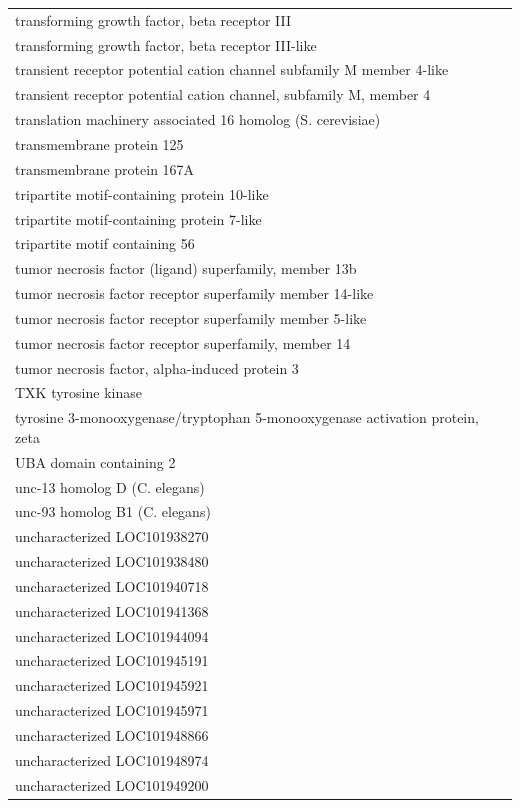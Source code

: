 \documentclass[english]{article}\usepackage[]{graphicx}\usepackage[]{color}
\begin{document}
\begin{longtable}{l}
transforming growth factor, beta receptor III \\ 
transforming growth factor, beta receptor III-like \\ 
transient receptor potential cation channel subfamily M member 4-like \\ 
transient receptor potential cation channel, subfamily M, member 4 \\ 
translation machinery associated 16 homolog (S. cerevisiae) \\ 
transmembrane protein 125 \\ 
transmembrane protein 167A \\ 
tripartite motif-containing protein 10-like \\ 
tripartite motif-containing protein 7-like \\ 
tripartite motif containing 56 \\ 
tumor necrosis factor (ligand) superfamily, member 13b \\ 
tumor necrosis factor receptor superfamily member 14-like \\ 
tumor necrosis factor receptor superfamily member 5-like \\ 
tumor necrosis factor receptor superfamily, member 14 \\ 
tumor necrosis factor, alpha-induced protein 3 \\ 
TXK tyrosine kinase \\ 
tyrosine 3-monooxygenase/tryptophan 5-monooxygenase activation protein, zeta \\ 
UBA domain containing 2 \\ 
unc-13 homolog D (C. elegans) \\ 
unc-93 homolog B1 (C. elegans) \\ 
uncharacterized LOC101938270 \\ 
uncharacterized LOC101938480 \\ 
uncharacterized LOC101940718 \\ 
uncharacterized LOC101941368 \\ 
uncharacterized LOC101944094 \\ 
uncharacterized LOC101945191 \\ 
uncharacterized LOC101945921 \\ 
uncharacterized LOC101945971 \\ 
uncharacterized LOC101948866 \\ 
uncharacterized LOC101948974 \\ 
uncharacterized LOC101949200 \\ 

\end{longtable}
\end{document}

